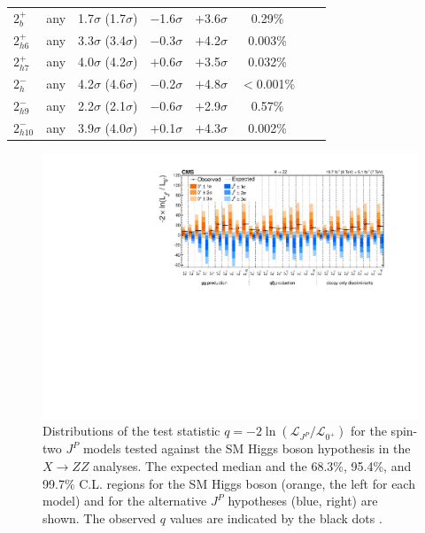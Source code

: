 \begin{table}
{\begin{tabular}{lccccccc}
$2^+_{b}$  & any                                 & 1.7$\sigma$ (1.7$\sigma$) & $-$1.6$\sigma$ & $+$3.6$\sigma$ & 0.29\%  \\
$2^+_{h6}$ & any                                 & 3.3$\sigma$ (3.4$\sigma$) & $-$0.3$\sigma$ & $+$4.2$\sigma$ & 0.003\%  \\
$2^+_{h7}$ & any                                 & 4.0$\sigma$ (4.2$\sigma$) & $+$0.6$\sigma$ & $+$3.5$\sigma$ & 0.032\%  \\
$2^-_{h}$  & any                                  & 4.2$\sigma$ (4.6$\sigma$) & $-$0.2$\sigma$ & $+$4.8$\sigma$ & $<$0.001\%  \\
$2^-_{h9}$ & any                                  & 2.2$\sigma$ (2.1$\sigma$) & $-$0.6$\sigma$ & $+$2.9$\sigma$ & 0.57\%  \\
$2^-_{h10}$ & any                                 & 3.9$\sigma$ (4.0$\sigma$) & $+$0.1$\sigma$ & $+$4.3$\sigma$ & 0.002\%  \\
\end{tabular}
}
\label{tab:jpmodels}
\end{table}

\begin{figure}
  \centering
    \includegraphics[width=\textwidth]{Spin_Parity/JP_SummaryPlot.pdf}
    \caption[Distributions of the test statistic $q=-2\ln(\mathcal{L}_{J^P}/\mathcal{L}_{0^+})$
       for the spin-two $J^{P}$ models tested against the SM Higgs boson hypothesis
      in the $X \to ZZ$ analyses.
      The expected median and the 68.3\%, 95.4\%, and 99.7\% C.L. regions for the SM Higgs boson (orange, the left for each model)
      and for the alternative $J^P$ hypotheses (blue, right) are shown.
     The observed $q$ values are indicated by the black dots.]{
        Distributions of the test statistic $q=-2\ln(\mathcal{L}_{J^P}/\mathcal{L}_{0^+})$
       for the spin-two $J^{P}$ models tested against the SM Higgs boson hypothesis
      in the $X \to ZZ$ analyses.
      The expected median and the 68.3\%, 95.4\%, and 99.7\% C.L. regions for the SM Higgs boson (orange, the left for each model)
      and for the alternative $J^P$ hypotheses (blue, right) are shown.
     The observed $q$ values are indicated by the black dots \cite{Khachatryan:2014kca}.
      \label{fig:jp_summary}
      }
\end{figure}

